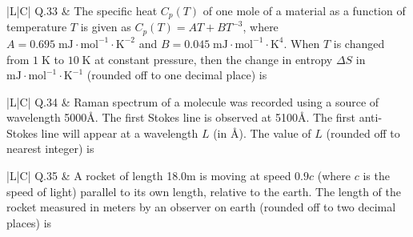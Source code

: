 \documentclass[12pt,a4paper]{article}
\begin{document}
\vspace{0.4cm}

\begin{table}[h!]
\begin{tabular}{|L|C|}
\hline
Q.33 &
The specific heat $C_p(T)$ of one mole of a material as a function of temperature $T$ is
given as $C_p(T) = AT + BT^{-3}$, where $A = 0.695\;\text{mJ}\cdot\text{mol}^{-1}
\cdot\text{K}^{-2}$ and $B = 0.045\;\text{mJ}\cdot\text{mol}^{-1}\cdot\text{K}^{4}$.
When $T$ is changed from $1\;\text{K}$ to $10\;\text{K}$ at constant pressure, then the
change in entropy $\Delta S$ in $\text{mJ}\cdot\text{mol}^{-1}\cdot\text{K}^{-1}$
(rounded off to one decimal place) is \underline{\hspace{1.5cm}} \\
\hline
\end{tabular}
\end{table}

\vspace{0.4cm}

\begin{table}[h!]
\begin{tabular}{|L|C|}
\hline
Q.34 &
Raman spectrum of a molecule was recorded using a source of wavelength 5000\;\AA. The
first Stokes line is observed at 5100\;\AA. The first anti-Stokes line will appear at a
wavelength $L$ (in \AA). The value of $L$ (rounded off to nearest integer) is
\underline{\hspace{1.5cm}} \\
\hline
\end{tabular}
\end{table}

\vspace{0.4cm}

\begin{table}[h!]
\begin{tabular}{|L|C|}
\hline
Q.35 &
A rocket of length 18.0\;m is moving at speed $0.9c$ (where $c$ is the speed of light)
parallel to its own length, relative to the earth. The length of the rocket measured in
meters by an observer on earth (rounded off to two decimal places) is
\underline{\hspace{1.5cm}} \\
\hline
\end{tabular}
\end{table}
\end{document}
